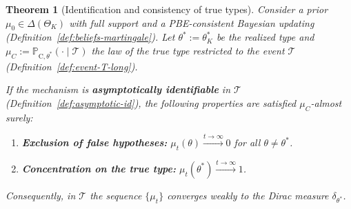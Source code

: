 \documentclass[ecta,nameyear,final,supplement]{econsocart}
\numberwithin{equation}{section}
\numberwithin{table}{section}
\newtheorem{theorem}{Theorem}[section]
\theoremstyle{definition}
\newcommand{\ProbC}[1]{\mathbb{P}_{\mathrm{C},#1}}
\begin{document}
\begin{theorem}[Identification and consistency of true types]
\label{thm:posterior-consistency}
Consider a prior $\mu_0\in\Delta(\Theta_K)$ with full support and a
PBE-consistent Bayesian updating
(Definition~\ref{def:beliefs-martingale}). Let $\theta^\ast:=\theta_K^\ast$ be the
realized type and $\mu_C:=\ProbC{\theta^\ast}(\cdot\mid\mathcal{T})$ the law
of the true type restricted to the event $\mathcal{T}$
(Definition~\ref{def:event-T-long}).

If the mechanism is \textbf{asymptotically identifiable} in $\mathcal{T}$
(Definition~\ref{def:asymptotic-id}), the following properties are satisfied
$\mu_C$-almost surely:
\begin{enumerate}
  \item \textbf{Exclusion of false hypotheses:}
  $\mu_t(\theta)\xrightarrow{t\to\infty}0$ for all $\theta\neq\theta^\ast$.
  \item \textbf{Concentration on the true type:}
  $\mu_t(\theta^\ast)\xrightarrow{t\to\infty}1$.
\end{enumerate}
Consequently, in $\mathcal{T}$ the sequence $\{\mu_t\}$ converges weakly
to the Dirac measure $\delta_{\theta^\ast}$.
\end{theorem}
\end{document}
